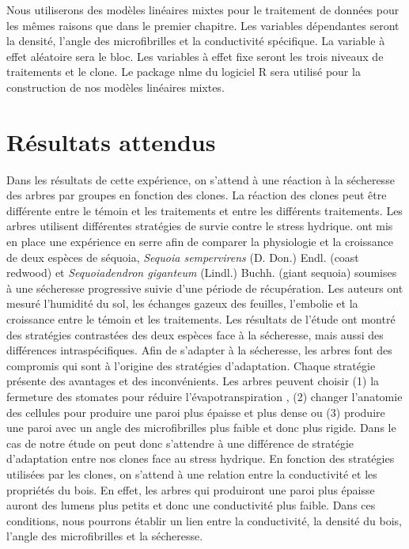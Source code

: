 \documentclass[a4paper,12pt]{report}
\begin{document}
Nous utiliserons des modèles linéaires mixtes pour le traitement de données pour les mêmes raisons que dans le premier chapitre. Les variables dépendantes seront la densité, l'angle des microfibrilles et la conductivité spécifique. La variable à effet aléatoire sera le bloc. Les variables à effet fixe seront les trois niveaux de traitements et le clone. Le package nlme \citep{NLME2018} du logiciel R sera utilisé pour la construction de nos modèles linéaires mixtes. 

\section{Résultats attendus}

Dans les résultats de cette expérience, on s'attend à une réaction à la sécheresse des arbres par groupes en fonction des clones. La réaction des clones peut être différente entre le témoin et les traitements et entre les différents traitements. Les arbres utilisent différentes stratégies de survie contre le stress hydrique. \cite{Ambrose2015} ont mis en place une expérience en serre afin de comparer la physiologie et la croissance de deux espèces de séquoia, \textit{Sequoia sempervirens} (D. Don.) Endl. (coast redwood) et \textit{Sequoiadendron giganteum} (Lindl.) Buchh. (giant sequoia) soumises à une sécheresse progressive suivie d'une période de récupération. Les auteurs ont mesuré l'humidité du sol, les échanges gazeux des feuilles, l'embolie et la croissance entre le témoin et les traitements. Les résultats de l'étude ont montré des stratégies contrastées des deux espèces face à la sécheresse, mais aussi des différences intraspécifiques. Afin de s'adapter à la sécheresse, les arbres font des compromis qui sont à l'origine des stratégies d'adaptation. Chaque stratégie présente des avantages et des  inconvénients. Les arbres peuvent choisir (1) la fermeture des stomates pour réduire l'évapotranspiration \citep{Martinez-Sancho2017}, (2) changer l'anatomie des cellules pour produire une paroi plus épaisse et plus dense ou (3) produire une paroi avec un angle des microfibrilles plus faible et donc plus rigide. Dans le cas de notre étude on peut donc s'attendre à une différence de stratégie d'adaptation entre nos clones face au stress hydrique. En fonction des stratégies utilisées par les clones, on s'attend à une relation entre la conductivité et les propriétés du bois. En effet, les arbres qui produiront une paroi plus épaisse auront des lumens plus petits et donc une conductivité plus faible. Dans ces conditions, nous pourrons établir un lien entre la conductivité, la densité du bois, l'angle des microfibrilles et la sécheresse. \\ %
\end{document}
